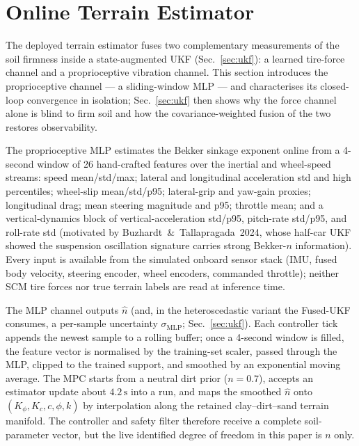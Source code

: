 \documentclass[conference,letterpaper,10pt]{IEEEtran}
\begin{document}
\section{Online Terrain Estimator}
\label{sec:estimator}

The deployed terrain estimator fuses two complementary measurements of
the soil firmness inside a state-augmented UKF (Sec.~\ref{sec:ukf}): a
learned tire-force channel and a proprioceptive vibration channel. This
section introduces the proprioceptive channel --- a sliding-window MLP
--- and characterises its closed-loop convergence in isolation;
Sec.~\ref{sec:ukf} then shows why the force channel alone is blind to
firm soil and how the covariance-weighted fusion of the two restores
observability.

The proprioceptive MLP estimates the Bekker sinkage exponent
online from a 4-second window of 26 hand-crafted features over the
inertial and wheel-speed streams: speed mean/std/max; lateral and
longitudinal acceleration std and high percentiles; wheel-slip
mean/std/p95; lateral-grip and yaw-gain proxies; longitudinal drag;
mean steering magnitude and p95; throttle mean; and a vertical-dynamics
block of vertical-acceleration std/p95, pitch-rate std/p95, and
roll-rate std (motivated by Buzhardt~\&~Tallapragada~2024, whose
half-car UKF showed the suspension oscillation signature carries
strong Bekker-$n$ information). Every input is available from the
simulated onboard sensor stack (IMU, fused body velocity, steering
encoder, wheel encoders, commanded throttle); neither SCM tire forces
nor true terrain labels are read at inference time.

The MLP channel outputs $\hat n$ (and, in the heteroscedastic variant
the Fused-UKF consumes, a per-sample uncertainty $\sigma_{\mathrm{MLP}}$;
Sec.~\ref{sec:ukf}). Each controller tick
appends the newest sample to a rolling buffer; once a 4-second window
is filled, the feature vector is normalised by the training-set
scaler, passed through the MLP, clipped to the trained support, and
smoothed by an exponential moving average. The MPC starts from a
neutral dirt prior ($n\!=\!0.7$), accepts an estimator update about
$4.2\,\mathrm{s}$ into a run, and maps the smoothed $\hat n$ onto
$(K_\phi,K_c,c,\phi,k)$ by interpolation along the retained
clay--dirt--sand terrain manifold. The controller and safety filter
therefore receive a complete soil-parameter vector, but the live
identified degree of freedom in this paper is $n$ only.
\end{document}

